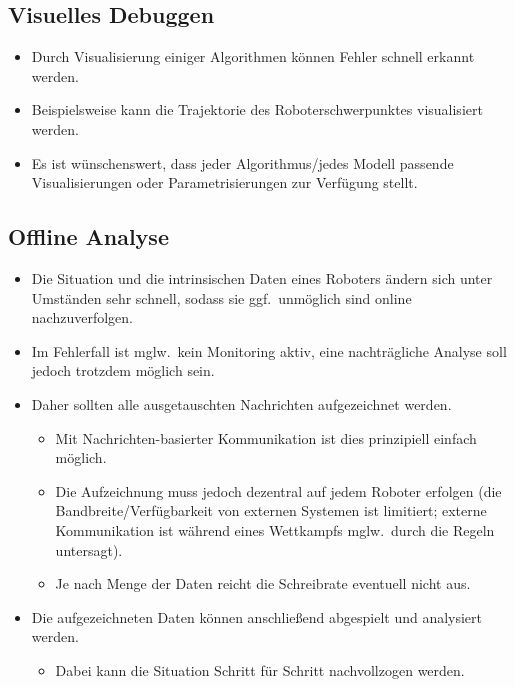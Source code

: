 \documentclass[a4paper, 11pt, accentcolor = tud3b]{tudreport}
\newcommand{\ggf}{ggf.~}
\newcommand{\mglw}{mglw.~}
\begin{document}
			\subsection{Visuelles Debuggen}
				\begin{itemize}
					\item Durch Visualisierung einiger Algorithmen können Fehler schnell erkannt werden.
					\item Beispielsweise kann die Trajektorie des Roboterschwerpunktes visualisiert werden.
					\item Es ist wünschenswert, dass jeder Algorithmus/jedes Modell passende Visualisierungen oder Parametrisierungen zur Verfügung stellt.
				\end{itemize}

			\subsection{Offline Analyse}
				\begin{itemize}
					\item Die Situation und die intrinsischen Daten eines Roboters ändern sich unter Umständen sehr schnell, sodass sie \ggf unmöglich sind online nachzuverfolgen.
					\item Im Fehlerfall ist \mglw kein Monitoring aktiv, eine nachträgliche Analyse soll jedoch trotzdem möglich sein.
					\item Daher sollten alle ausgetauschten Nachrichten aufgezeichnet werden.
						\begin{itemize}
							\item Mit Nachrichten-basierter Kommunikation ist dies prinzipiell einfach möglich.
							\item Die Aufzeichnung muss jedoch dezentral auf jedem Roboter erfolgen (die Bandbreite/Verfügbarkeit von externen Systemen ist limitiert; externe Kommunikation ist während eines Wettkampfs \mglw durch die Regeln untersagt).
							\item Je nach Menge der Daten reicht die Schreibrate eventuell nicht aus.
						\end{itemize}
					\item Die aufgezeichneten Daten können anschließend abgespielt und analysiert werden.
						\begin{itemize}
							\item Dabei kann die Situation Schritt für Schritt nachvollzogen werden.
						\end{itemize}
				\end{itemize}
\end{document}
